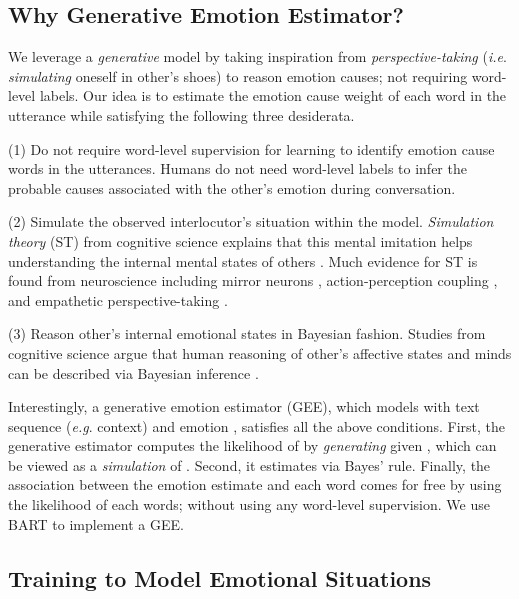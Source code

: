 \documentclass[11pt]{article}
\makeatletter
\DeclareRobustCommand\onedot{\futurelet\@let@token\@onedot}
\def\onedot{. }
\def\eg{\emph{e.g}\onedot} \def\Eg{\emph{E.g}\onedot}
\def\ie{\emph{i.e}\onedot} \def\Ie{\emph{I.e}\onedot}
\makeatother
\begin{document}
\subsection{Why Generative Emotion Estimator?}
\label{subsec:why_gee}
We leverage a \textit{generative} model by taking inspiration from \textit{perspective-taking} (\ie \textit{simulating} oneself in other's shoes) to reason emotion causes; not requiring word-level labels.
Our idea is to estimate the emotion cause weight of each word in the utterance while satisfying the following three desiderata.


(1) Do not require word-level supervision for learning to identify emotion cause words in the utterances.
Humans do not need word-level labels to infer the probable causes associated with the other's emotion during conversation.

(2) Simulate the observed interlocutor's situation within the model.
\textit{Simulation theory} (ST) from cognitive science explains that this mental imitation helps understanding the internal mental states of others \citep{Gallese:2004:TiCS}.
Much evidence for ST is found from neuroscience including mirror neurons \citep{Rizzolatti:2004:RevNeuro}, action-perception coupling \citep{Decety:2003:Neural}, and empathetic perspective-taking \citep{Ruby:2004:JCogNeuro}.


(3) Reason other's internal emotional states in Bayesian fashion.
Studies from cognitive science argue that human reasoning of other's affective states and minds can be described via Bayesian inference \citep{Griffiths:2008:Cambridge, Ong:2015:Cognition, Saxe:2017:Curr, Ong:2019:topics}.


Interestingly, a generative emotion estimator (GEE), which models  with text sequence (\eg context)  and emotion , satisfies all the above conditions.
First, the generative estimator computes the likelihood of  by \textit{generating}  given , which can be viewed as a \textit{simulation} of .
Second, it estimates  via Bayes' rule.
Finally, the association between the emotion estimate and each word comes for free by using the likelihood of each words; without using any word-level supervision.
We use BART \citep{Lewis:2020:ACL} to implement a GEE. 



\subsection{Training to Model Emotional Situations}
\label{subsec:train_gee}
\end{document}
